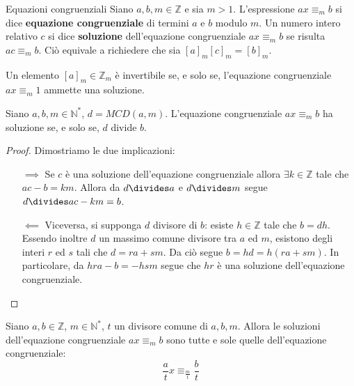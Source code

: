 \begin{defbox}{Equazioni congruenziali}
	Siano $a,b,m \in \mathbb{Z}$ e sia $m>1$. L'espressione	$ax \equiv_{m} b$ si dice \textbf{equazione congruenziale} di termini $a$ e $b$ modulo $m$. Un numero intero relativo $c$ si dice \textbf{soluzione} dell'equazione congruenziale $ax \equiv_{m} b$ se risulta $ac \equiv_{m} b$. Ciò equivale a richiedere che sia $[a]_{m}[c]_{m} = [b]_{m}$.
\end{defbox}

\begin{osservation}
	Un elemento $[a]_{m} \in \mathbb{Z}_{m}$ è invertibile se, e solo se, l'equazione congruenziale $ax \equiv_{m} 1$ ammette una soluzione.
\end{osservation}

\begin{propbox}
	Siano $a,b, m \in \mathbb{N}^{*}$, $d=MCD(a,m)$. L'equazione congruenziale $ax \equiv_{m} b$ ha soluzione se, e solo se, $d$ divide $b$.
\end{propbox}

\begin{proof}Dimostriamo le due implicazioni:
\begin{itemize} 
	\item[$\implies$] Se $c$ è una soluzione dell'equazione congruenziale allora $\exists k \in \mathbb{Z}$ tale che $ac-b=km$. Allora da $d \divides a$ e $d \divides m$ segue $d \divides ac-km = b$.
	
	\item[$\impliedby$] Viceversa, si supponga $d$ divisore di $b$: esiste $h \in \mathbb{Z}$ tale che $b=dh$. Essendo inoltre $d$ un massimo comune divisore tra $a$ ed $m$, esistono degli interi $r$ ed $s$ tali che $d=ra+sm$. Da ciò segue $b=hd=h(ra+sm)$. In particolare, da $hra-b=-hsm$ segue che $hr$ è una soluzione dell'equazione congruenziale.
\end{itemize}
\end{proof}

\begin{propbox}
	Siano $a,b \in \mathbb{Z}$, $m \in \mathbb{N}^{*}$, $t$ un divisore comune di $a,b,m$. Allora le soluzioni dell'equazione congruenziale $ax \equiv_{m} b$ sono tutte e sole quelle dell'equazione congruenziale:
	\begin{displaymath}
		\frac{a}{t} x \equiv_{\frac{m}{t}} \frac{b}{t}
	\end{displaymath}
\end{propbox}

